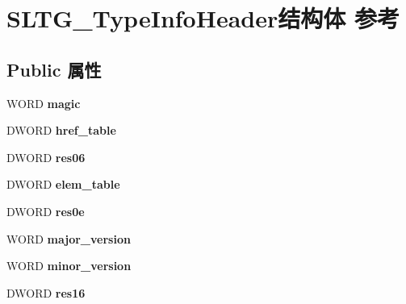 \hypertarget{struct_s_l_t_g___type_info_header}{}\section{S\+L\+T\+G\+\_\+\+Type\+Info\+Header结构体 参考}
\label{struct_s_l_t_g___type_info_header}
\subsection*{Public 属性}
\begin{DoxyCompactItemize}
\item 
\mbox{\label{struct_s_l_t_g___type_info_header_ad9e2b192a3634847c0bbef405ee9cf41}} 
W\+O\+RD {\bfseries magic}
\item 
\mbox{\label{struct_s_l_t_g___type_info_header_a015d62c42596874e4bdb39225cc5c6c2}} 
D\+W\+O\+RD {\bfseries href\+\_\+table}
\item 
\mbox{\label{struct_s_l_t_g___type_info_header_a5ee3c691ef8167196a882b3cd6c81c67}} 
D\+W\+O\+RD {\bfseries res06}
\item 
\mbox{\label{struct_s_l_t_g___type_info_header_a7e96fcd08b8bcba01b4168b0db4aaaf8}} 
D\+W\+O\+RD {\bfseries elem\+\_\+table}
\item 
\mbox{\label{struct_s_l_t_g___type_info_header_a38a752a9fce589efba6f3a4c3c6efd14}} 
D\+W\+O\+RD {\bfseries res0e}
\item 
\mbox{\label{struct_s_l_t_g___type_info_header_a84c81198f501abc8c105d1305cc08d9a}} 
W\+O\+RD {\bfseries major\+\_\+version}
\item 
\mbox{\label{struct_s_l_t_g___type_info_header_a53627de3e63e679bb99f1b9eeda3361d}} 
W\+O\+RD {\bfseries minor\+\_\+version}
\item 
\mbox{\label{struct_s_l_t_g___type_info_header_ac934986b73988c13133e4fb48d6349c0}} 
D\+W\+O\+RD {\bfseries res16}

\end{DoxyCompactItemize}
